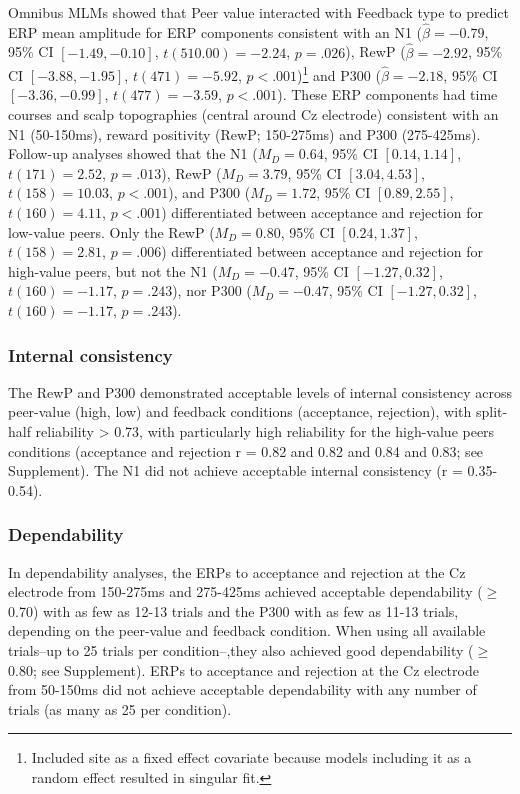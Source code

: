 \documentclass[
  man]{apa7}
\begin{document}
Omnibus MLMs showed that Peer value interacted with Feedback type to predict ERP mean amplitude for ERP components consistent with an N1 (\(\hat{\beta} = -0.79\), 95\% CI \([-1.49, -0.10]\), \(t(510.00) = -2.24\), \(p = .026\)), RewP (\(\hat{\beta} = -2.92\), 95\% CI \([-3.88, -1.95]\), \(t(471) = -5.92\), \(p < .001\))\footnote{Included site as a fixed effect covariate because models including it as a random effect resulted in singular fit.} and P300 (\(\hat{\beta} = -2.18\), 95\% CI \([-3.36, -0.99]\), \(t(477) = -3.59\), \(p < .001\)). These ERP components had time courses and scalp topographies (central around Cz electrode) consistent with an N1 (50-150ms), reward positivity (RewP; 150-275ms) and P300 (275-425ms). Follow-up analyses showed that the N1 (\(M_D = 0.64\), 95\% CI \([0.14, 1.14]\), \(t(171) = 2.52\), \(p = .013\)), RewP (\(M_D = 3.79\), 95\% CI \([3.04, 4.53]\), \(t(158) = 10.03\), \(p < .001\)), and P300 (\(M_D = 1.72\), 95\% CI \([0.89, 2.55]\), \(t(160) = 4.11\), \(p < .001\)) differentiated between acceptance and rejection for low-value peers. Only the RewP (\(M_D = 0.80\), 95\% CI \([0.24, 1.37]\), \(t(158) = 2.81\), \(p = .006\)) differentiated between acceptance and rejection for high-value peers, but not the N1 (\(M_D = -0.47\), 95\% CI \([-1.27, 0.32]\), \(t(160) = -1.17\), \(p = .243\)), nor P300 (\(M_D = -0.47\), 95\% CI \([-1.27, 0.32]\), \(t(160) = -1.17\), \(p = .243\)).

\hypertarget{internal-consistency}{%
\subsubsection{Internal consistency}\label{internal-consistency}}

The RewP and P300 demonstrated acceptable levels of internal consistency across peer-value (high, low) and feedback conditions (acceptance, rejection), with split-half reliability \textgreater{} 0.73, with particularly high reliability for the high-value peers conditions (acceptance and rejection r = 0.82 and 0.82 and 0.84 and 0.83; see Supplement). The N1 did not achieve acceptable internal consistency (r = 0.35-0.54).

\hypertarget{dependability}{%
\subsubsection{Dependability}\label{dependability}}

In dependability analyses, the ERPs to acceptance and rejection at the Cz electrode from 150-275ms and 275-425ms achieved acceptable dependability (\(\ge\) 0.70) with as few as 12-13 trials and the P300 with as few as 11-13 trials, depending on the peer-value and feedback condition. When using all available trials--up to 25 trials per condition--,they also achieved good dependability (\(\ge\) 0.80; see Supplement). ERPs to acceptance and rejection at the Cz electrode from 50-150ms did not achieve acceptable dependability with any number of trials (as many as 25 per condition).
\end{document}
